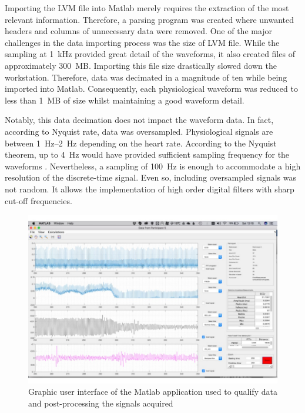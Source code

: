 Importing the LVM file into Matlab merely requires the extraction of the most relevant information. Therefore, a parsing program was created where unwanted headers and columns of unnecessary data were removed. One of the major challenges in the data importing process was the size of LVM file. While the sampling at \SI{1}{\kilo\hertz} provided great detail of the waveforms, it also created files of approximately \SI{300}{MB}. Importing this file size drastically slowed down the workstation. Therefore, data was decimated in a magnitude of ten while being imported into Matlab. Consequently, each physiological waveform was reduced to less than \SI{1}{MB} of size whilst maintaining a good waveform detail. 

Notably, this data decimation does not impact the waveform data. In fact, according to Nyquist rate, data was oversampled. Physiological signals are between \SIrange{1}{2}{\hertz} depending on the heart rate. According to the Nyquist theorem, up to \SI{4}{\hertz} would have provided sufficient sampling frequency for the waveforms \cite{nyquist1928certain}. Nevertheless, a sampling of \SI{100}{\hertz} is enough to accommodate a high resolution of the discrete-time signal. Even so, including oversampled signals was not random. It allows the implementation of high order digital filters with sharp cut-off frequencies. 

\begin{figure}[!htpb]
	\centering
	\includegraphics[width=15cm,keepaspectratio]{figure4}
	\caption[Graphic user interface of the Matlab application]{Graphic user interface of the Matlab application used to qualify data and post-processing the signals acquired}
	\label{fig:Matlalb Interface}
\end{figure}

